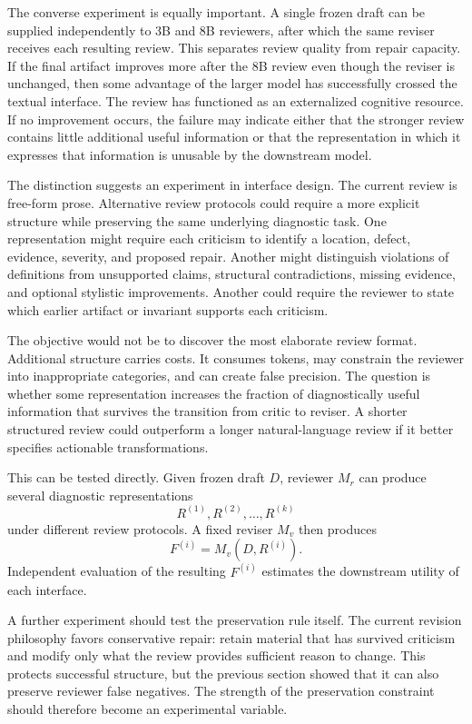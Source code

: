 \documentclass[11pt]{article}
\begin{document}
The converse experiment is equally important. A single frozen draft can be supplied independently to 3B and 8B reviewers, after which the same reviser receives each resulting review. This separates review quality from repair capacity. If the final artifact improves more after the 8B review even though the reviser is unchanged, then some advantage of the larger model has successfully crossed the textual interface. The review has functioned as an externalized cognitive resource. If no improvement occurs, the failure may indicate either that the stronger review contains little additional useful information or that the representation in which it expresses that information is unusable by the downstream model.

The distinction suggests an experiment in interface design. The current review is free-form prose. Alternative review protocols could require a more explicit structure while preserving the same underlying diagnostic task. One representation might require each criticism to identify a location, defect, evidence, severity, and proposed repair. Another might distinguish violations of definitions from unsupported claims, structural contradictions, missing evidence, and optional stylistic improvements. Another could require the reviewer to state which earlier artifact or invariant supports each criticism.

The objective would not be to discover the most elaborate review format. Additional structure carries costs. It consumes tokens, may constrain the reviewer into inappropriate categories, and can create false precision. The question is whether some representation increases the fraction of diagnostically useful information that survives the transition from critic to reviser. A shorter structured review could outperform a longer natural-language review if it better specifies actionable transformations.

This can be tested directly. Given frozen draft \(D\), reviewer \(M_r\) can produce several diagnostic representations
\[
    R^{(1)},R^{(2)},\ldots,R^{(k)}
\]
under different review protocols. A fixed reviser \(M_v\) then produces
\[
    F^{(i)}
    =
    M_v(D,R^{(i)}).
\]
Independent evaluation of the resulting \(F^{(i)}\) estimates the downstream utility of each interface.

A further experiment should test the preservation rule itself. The current revision philosophy favors conservative repair: retain material that has survived criticism and modify only what the review provides sufficient reason to change. This protects successful structure, but the previous section showed that it can also preserve reviewer false negatives. The strength of the preservation constraint should therefore become an experimental variable.
\end{document}
